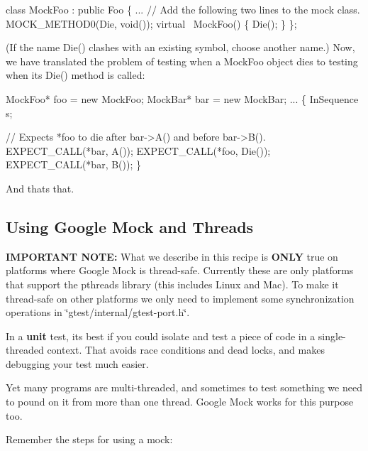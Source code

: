 \begin{DoxyCode}
\textcolor{keyword}{class }MockFoo : \textcolor{keyword}{public} Foo \{
  ...
  \textcolor{comment}{// Add the following two lines to the mock class.}
  MOCK\_METHOD0(Die, \textcolor{keywordtype}{void}());
  \textcolor{keyword}{virtual} ~MockFoo() \{ Die(); \}
\};
\end{DoxyCode}


(If the name {\ttfamily Die()} clashes with an existing symbol, choose another name.) Now, we have translated the problem of testing when a {\ttfamily Mock\+Foo} object dies to testing when its {\ttfamily Die()} method is called\+:


\begin{DoxyCode}
MockFoo* foo = \textcolor{keyword}{new} MockFoo;
MockBar* bar = \textcolor{keyword}{new} MockBar;
...
\{
  InSequence s;

  \textcolor{comment}{// Expects *foo to die after bar->A() and before bar->B().}
  EXPECT\_CALL(*bar, A());
  EXPECT\_CALL(*foo, Die());
  EXPECT\_CALL(*bar, B());
\}
\end{DoxyCode}


And that\textquotesingle{}s that.

\subsection*{Using Google Mock and Threads}

{\bfseries I\+M\+P\+O\+R\+T\+A\+NT N\+O\+TE\+:} What we describe in this recipe is {\bfseries O\+N\+LY} true on platforms where Google Mock is thread-\/safe. Currently these are only platforms that support the pthreads library (this includes Linux and Mac). To make it thread-\/safe on other platforms we only need to implement some synchronization operations in {\ttfamily \char`\"{}gtest/internal/gtest-\/port.\+h\char`\"{}}.

In a {\bfseries unit} test, it\textquotesingle{}s best if you could isolate and test a piece of code in a single-\/threaded context. That avoids race conditions and dead locks, and makes debugging your test much easier.

Yet many programs are multi-\/threaded, and sometimes to test something we need to pound on it from more than one thread. Google Mock works for this purpose too.

Remember the steps for using a mock\+:


